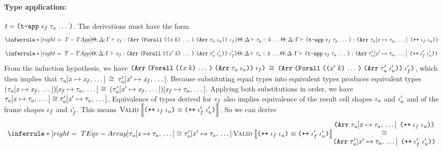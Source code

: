 \begin{sproof}
  \paragraph{Type application:}
  $\term = \tapp{\expr_f}{\sequence{\type_a}}$.
  The derivations must have the form
  \[\infr[T-TApp]
  {\typeof{\sEnv}{\kEnv}{\tEnv}
    {\expr_f}
    {\typearray{\typeuniv{\sequence{\notevar{\var}{\kind}}}{\typearray{\type_u}{\idx_u}}}{\idx_f}}
    \\\\ \sequence{\kindof{\sEnv}{\kEnv}{\type_a}{\kind}}}
  {\typeof{\sEnv}{\kEnv}{\tEnv}
    {\tapp{\expr_f}{\sequence{\type_a}}}
    {\typearray{\seqsubst{\type_u}{\var}{\type_a}}{\idxappend{\idx_f\;\idx_u}}}}\]
  \ctrand
  \[\infr[T-TApp]
  {\typeof{\sEnv}{\kEnv}{\tEnv}
    {\expr_f}
    {\typearray{\typeuniv{\sequence{\notevar{\var'}{\kind}}}{\typearray{\type_u'}{\idx_u'}}}{\idx_f'}}
    \\\\ \sequence{\kindof{\sEnv}{\kEnv}{\type_a}{\kind}}}
  {\typeof{\sEnv}{\kEnv}{\tEnv}
    {\tapp{\expr_f}{\sequence{\type_a}}}
    {\typearray{\seqsubst{\type_u'}{\var'}{\type_a}}{\idxappend{\idx_f'\;\idx_u'}}}}\]
  From the induction hypothesis, we have
  ${\typearray{\typeuniv{\sequence{\notevar{\var}{\kind}}}{\typearray{\type_u}{\idx_u}}}{\idx_f}}$
  $\cong$
  ${\typearray{\typeuniv{\sequence{\notevar{\var'}{\kind}}}{\typearray{\type_u'}{\idx_u'}}}{\idx_f'}}$,
  which then implies that
  ${\mathit{\tau}_u\hspace{-2pt}\left[ \mathit{x} \mapsto \mathit{x}_f, \, \ldots \, \right]}$
  $\cong$
  ${\mathit{\tau}_u'\hspace{-2pt}\left[ \mathit{x}' \mapsto \mathit{x}_f, \, \ldots \, \right]}$.
  Because substituting equal types into equivalent types produces equivalent types
  ${\left( \mathit{\tau}_u\hspace{-2pt}\left[ \mathit{x} \mapsto \mathit{x}_f, \, \ldots \, \right] \right)\hspace{-2pt}\left[ \mathit{x}_f \mapsto \mathit{\tau}_a, \, \ldots \, \right]}$
  $\cong$
  ${\left( \mathit{\tau}_u'\hspace{-2pt}\left[ \mathit{x}' \mapsto \mathit{x}_f, \, \ldots \, \right] \right)\hspace{-2pt}\left[ \mathit{x}_f \mapsto \mathit{\tau}_a, \, \ldots \, \right]}$.
  Applying both substitutions in order,
  we have
  $\mathit{\tau}_u\hspace{-2pt}\left[ \mathit{x} \mapsto \mathit{\tau}_a, \, \ldots \, \right] \cong \mathit{\tau}_u'\hspace{-2pt}\left[ \mathit{x}' \mapsto \mathit{\tau}_a, \, \ldots \, \right]$.
  Equivalence of types derived for $\mathit{e}_f$ also implies
  equivalence of the result cell shapes $\mathit{\iota}_u$ and $\mathit{\iota}_u'$
  and of the frame shapes $\mathit{\iota}_f$ and $\mathit{\iota}_f'$.
  This means $\ieqv{\idxappend{\idx_f \; \idx_u}}{\idxappend{\idx_f' \; \idx_u'}}$.
  So we can derive
  \[\infr[TEqv-Array]
  {\teqv
    {\seqsubst{\type_u}{\var}{\type_a}}
    {\seqsubst{\type_u'}{\var'}{\type_a}}
    \\\\ \ieqv{\idxappend{\idx_f \; \idx_u}}{\idxappend{\idx_f' \; \idx_u'}}}
  {\parbox{0.42\textwidth}
    {\centering
      \({\typearray{\seqsubst{\type_u}{\var}{\type_a}}{\idxappend{\idx_f\;\idx_u}}}\)\\
      \(\teqv{}{}{\typearray{\seqsubst{\type_u'}{\var'}{\type_a}}{\idxappend{\idx_f'\;\idx_u'}}}\)}}\]

\end{sproof}
